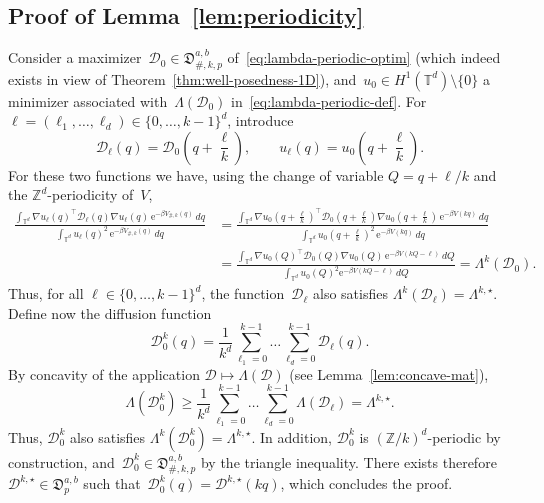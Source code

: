 \documentclass{article}
\newcommand{\dps}{\displaystyle }
\newcommand{\rme}{\mathrm{e}}
\renewcommand{\geq}{\geqslant}
\def\T{\mathbb{T}}
\def\Z{\mathbb{Z}}
\newcommand{\Diff}{\mathcal{D}}
\newcommand{\Diffset}{\mathfrak{D}}
\renewcommand{\dim}{d}
\begin{document}
\subsection{Proof of Lemma~\ref{lem:periodicity}}
\label{app:lem:periodicity}

Consider a maximizer~$\Diff_0 \in \Diffset_{\#,k,p}^{a,b}$ of~\eqref{eq:lambda-periodic-optim} (which indeed exists in view of Theorem~\ref{thm:well-posedness-1D}), and~$u_0 \in H^1(\T^\dim) \setminus \{0\}$ a minimizer associated with~$\Lambda(\Diff_0)$ in~\eqref{eq:lambda-periodic-def}. For $\ell=(\ell_1,\dots,\ell_\dim) \in \{0,\dots,k-1\}^\dim$, introduce
\[
\Diff_\ell(q) = \Diff_0\left(q+\frac{\ell}{k}\right), \qquad u_\ell(q) = u_0\left(q+\frac{\ell}{k}\right).
\]
For these two functions we have, using the change of variable $Q = q + \ell/k$ and the $\mathbb{Z}^\dim$-periodicity of~$V$,
\begin{align}
\frac{\dps \int_{\T^\dim}\nabla u_\ell(q)^\top\Diff_\ell(q)\nabla u_\ell(q)\, \rme^{-\beta V_{\#,k}(q)} \, dq}{\dps \int_{\T^\dim} u_\ell(q)^2 \, \rme^{-\beta V_{\#,k}(q)} \, dq} & = \frac{\dps \int_{\T^\dim}\nabla u_0\left(q+\frac{\ell}{k}\right)^\top \Diff_0\left(q+\frac{\ell}{k}\right)\nabla  u_0\left(q+\frac{\ell}{k}\right)\,\rme^{-\beta V(kq)}\,dq}{\dps \int_{\T^\dim}  u_0\left(q+\frac{\ell}{k}\right)^2 \, \rme^{-\beta V(kq)}\,dq} \\
& = \frac{\dps \int_{\T^\dim}\nabla u_0(Q)^\top\Diff_0(Q)\nabla  u_0(Q)\,\rme^{-\beta V(kQ-\ell)} \, dQ}{\dps \int_{\T^\dim}  u_0(Q)^2 \rme^{-\beta V(kQ-\ell)} \, dQ} = \Lambda^k(\Diff_0).
\end{align}
Thus, for all $\ell \in \{0,\dots,k-1\}^\dim$, the function~$\mathcal{D}_\ell$ also satisfies $\Lambda^k(\Diff_\ell) = \Lambda^{k,\star}$. Define now the diffusion function
\[
\Diff_0^k(q) = \frac{1}{k^\dim}\sum_{\ell_1=0}^{k-1}\dots \sum_{\ell_\dim=0}^{k-1}\Diff_\ell(q).
\]
By concavity of the application $\Diff\mapsto\Lambda(\Diff)$ (see Lemma~\ref{lem:concave-mat}),
\[
\Lambda(\Diff_0^k)\geq \frac{1}{k^\dim}\sum_{\ell_1=0}^{k-1}\dots \sum_{\ell_\dim=0}^{k-1}\Lambda(\Diff_\ell) = \Lambda^{k,\star}.
\]
Thus, $\Diff_0^k$ also satisfies $\Lambda^k(\Diff_0^k) = \Lambda^{k,\star}$. In addition, $\Diff_0^k$ is $(\Z/k)^\dim$-periodic by construction, and~$\Diff_0^k \in\Diffset_{\#,k,p}^{a,b}$ by the triangle inequality. There exists therefore~$\Diff^{k,\star} \in \Diffset_{p}^{a,b}$ such that~$\Diff_0^k(q) = \Diff^{k,\star}(kq)$, which concludes the proof. 
\end{document}
